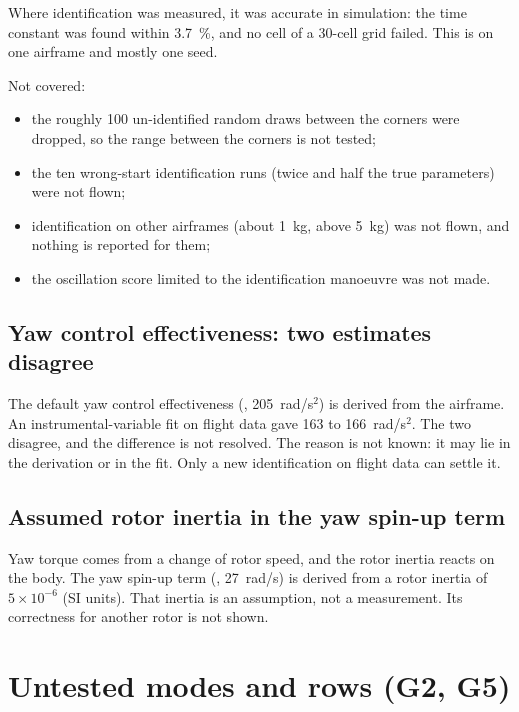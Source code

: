 Where identification was measured, it was accurate in simulation: the time constant was found within 3.7~\%, and no cell of a 30-cell grid failed.
This is on one airframe and mostly one seed.

Not covered:
\begin{itemize}
  \item the roughly 100 un-identified random draws between the corners were dropped, so the range between the corners is not tested;
  \item the ten wrong-start identification runs (twice and half the true parameters) were not flown;
  \item identification on other airframes (about 1~kg, above 5~kg) was not flown, and nothing is reported for them;
  \item the oscillation score limited to the identification manoeuvre was not made.
\end{itemize}

\subsection{Yaw control effectiveness: two estimates disagree}

The default yaw control effectiveness (, 205~rad/s$^2$) is derived from the airframe.
An instrumental-variable fit on flight data gave 163 to 166~rad/s$^2$.
The two disagree, and the difference is not resolved.
The reason is not known: it may lie in the derivation or in the fit.
Only a new identification on flight data can settle it.

\subsection{Assumed rotor inertia in the yaw spin-up term}

Yaw torque comes from a change of rotor speed, and the rotor inertia reacts on the body.
The yaw spin-up term (, 27~rad/s) is derived from a rotor inertia of $5\times 10^{-6}$ (SI units).
That inertia is an assumption, not a measurement.
Its correctness for another rotor is not shown.

\section{Untested modes and rows (G2, G5)}\label{sec:lim_untested}

